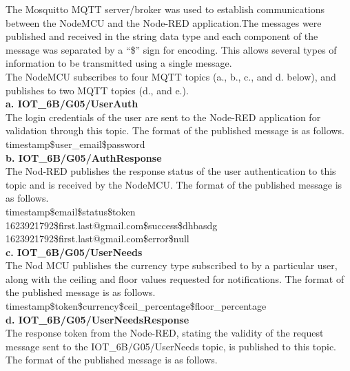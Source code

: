 The Mosquitto MQTT \cite{mosq} server/broker was used to establish communications between the NodeMCU and the Node-RED application.The messages were published and received in the string data type and each component of the message was separated by a “\$” sign for encoding. This allows several types of information to be transmitted using a single message.\\

The NodeMCU subscribes to four MQTT topics (a., b., c., and d. below), and publishes to two MQTT topics (d., and e.).\\

\textbf{a. IOT\_6B/G05/UserAuth}\\

The login credentials of the user are sent to the Node-RED application for validation through this topic. The format of the published message is as follows.\\

timestamp\$user\_email\$password\\

\textbf{b. IOT\_6B/G05/AuthResponse}\\

The Nod-RED publishes the response status of the user authentication to this topic and is received by the NodeMCU. The format of the published message is as follows.\\

timestamp\$email\$status\$token\\
1623921792\$first.last@gmail.com\$success\$dhbasdg\\
1623921792\$first.last@gmail.com\$error\$null\\

\textbf{c. IOT\_6B/G05/UserNeeds}\\

The Nod MCU publishes the currency type subscribed to by a particular user, along with the ceiling and floor values requested for notifications. The format of the published message is as follows.\\

timestamp\$token\$currency\$ceil\_percentage\$floor\_percentage\\

\textbf{d. IOT\_6B/G05/UserNeedsResponse}\\

The response token from the Node-RED, stating the validity of the request message sent to the IOT\_6B/G05/UserNeeds topic, is published to this topic.  The format of the published message is as follows.\\

